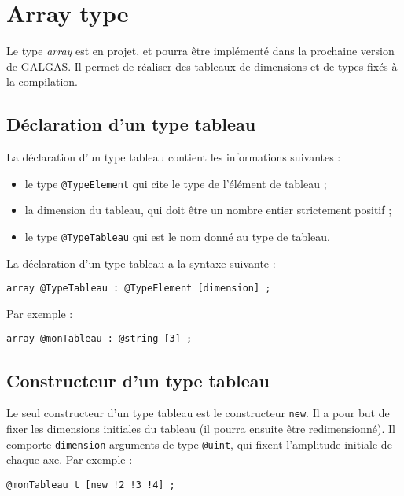 \newpage
\section{Array type}

Le type \emph{array} est en projet, et pourra être implémenté dans la prochaine version de GALGAS. Il permet de réaliser des tableaux de dimensions et de types fixés à la compilation.

\subsection{Déclaration d'un type tableau}

La déclaration d'un type tableau contient les informations suivantes :
\begin{itemize}
  \item le type \lstinline[language=galgas]!@TypeElement! qui cite le type de l'élément de tableau ;
  \item la dimension du tableau, qui doit être un nombre entier strictement positif ;
  \item le type \lstinline[language=galgas]!@TypeTableau! qui est le nom donné au type de tableau.
\end{itemize}

La déclaration d'un type tableau a la syntaxe suivante :
\begin{lstlisting}[language=galgas]
array @TypeTableau : @TypeElement [dimension] ;
\end{lstlisting}

Par exemple :
\begin{lstlisting}[language=galgas]
array @monTableau : @string [3] ;
\end{lstlisting}


\subsection{Constructeur d'un type tableau}

Le seul constructeur d'un type tableau est le constructeur \lstinline[language=galgas]!new!. Il a pour but de fixer les dimensions initiales du tableau (il pourra ensuite être redimensionné). Il comporte \lstinline[language=galgas]!dimension! arguments de type \lstinline[language=galgas]!@uint!, qui fixent l'amplitude initiale de chaque axe.
Par exemple :
\begin{lstlisting}[language=galgas]
  @monTableau t [new !2 !3 !4] ;
\end{lstlisting}

